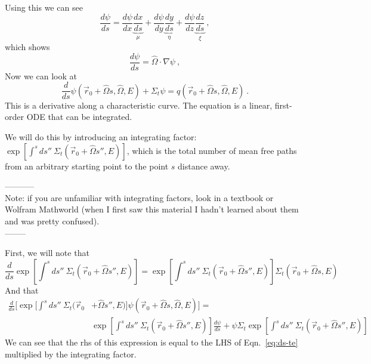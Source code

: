 \documentclass[12pt]{article}
\newcommand{\rvec}{\ensuremath{\vec{r}}}
\newcommand{\vOmega}{\ensuremath{\hat{\Omega}}}
\begin{document}
Using this we can see
\[\frac{d\psi}{ds} = \frac{d\psi}{dx}\underbrace{\frac{dx}{ds}}_{\mu} + \frac{d\psi}{dy}\underbrace{\frac{dy}{ds}}_{\eta} + \frac{d\psi}{dz}\underbrace{\frac{dz}{ds}}_{\xi}\:,\]
which shows 
\[\frac{d\psi}{ds} = \vOmega \cdot \nabla \psi\:,\]
Now we can look at
\begin{equation}
\frac{d}{ds}\psi(\rvec_0 + \vOmega s, \vOmega, E) + \Sigma_t \psi = q(\rvec_0 + \vOmega s, \vOmega, E)\:.
\label{eq:ds-te}
\end{equation}
This is a derivative along a characteristic curve. 
The equation is a linear, first-order ODE that can be integrated. 


We will do this by introducing an integrating factor: $\exp[\int^s ds'' \: \Sigma_t(\rvec_0 + \vOmega s'', E)]$, which is the total number of mean free paths from an arbitrary starting point to the point $s$ distance away.

-----------\\
Note: if you are unfamiliar with integrating factors, look in a textbook or Wolfram Mathworld (when I first saw this material I hadn't learned about them and was pretty confused). \\
--------

First, we will note that
\[\frac{d}{ds}\exp[\int^s ds'' \: \Sigma_t(\rvec_0 + \vOmega s'', E)] = \exp[\int^s ds'' \: \Sigma_t(\rvec_0 + \vOmega s'', E)] \Sigma_t(\rvec_0 + \vOmega s, E)\]
And that
\begin{align*}
\frac{d}{ds}\bigl[\exp[\int^s ds'' \: \Sigma_t(\rvec_0 &+ \vOmega s'', E)]\psi(\rvec_0 + \vOmega s, \vOmega, E)\bigr] =\\ &\exp[\int^s ds'' \: \Sigma_t(\rvec_0 + \vOmega s'', E)]\frac{d \psi}{ds} + \psi \Sigma_t \exp[\int^s ds'' \: \Sigma_t(\rvec_0 + \vOmega s'', E)]
\end{align*}
We can see that the rhs of this expression is equal to the LHS of Eqn.~\ref{eq:ds-te} multiplied by the integrating factor.
\end{document}
